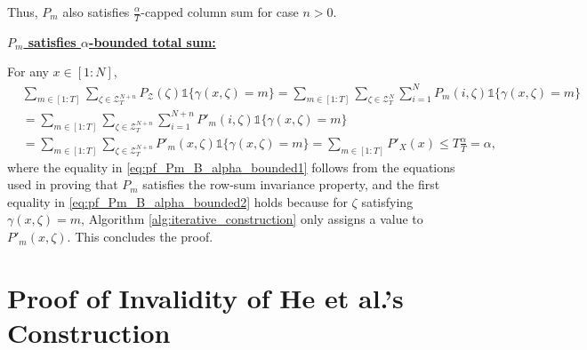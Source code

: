 \documentclass[11pt,letterpaper]{article}
\newcommand{\cZ}{\mathcal{Z}}
\begin{document}
Thus, $P_m$ also satisfies $\tfrac{\alpha}{T}$-capped column sum for case $n>0$.


\underline{\textbf{$P_m$ satisfies $\alpha$-bounded total sum:}}

For any $x\in[1:N]$, 
\begin{align}
    & \sum_{m \in [1:T]} \sum_{\zeta \in \cZ^{N+n}_T} P_\cZ(\zeta)\mathds{1} {\{ \gamma(x,\zeta) = m\}}  = \sum_{m \in [1:T]} \sum_{\zeta \in \cZ^{N}_T} \sum_{i=1}^{N} P_m(i,\zeta)\mathds{1} {\{ \gamma(x,\zeta) = m\}}\\
    & = \sum_{m \in [1:T]} \sum_{\zeta \in \cZ^{N+n}_T} \sum_{i=1}^{N+n} P'_m(i,\zeta)\mathds{1} {\{ \gamma(x,\zeta) = m\}}  \label{eq:pf_Pm_B_alpha_bounded1} \\
    & = \sum_{m \in [1:T]} \sum_{\zeta \in \cZ^{N+n}_T} P'_m(x,\zeta)\mathds{1} {\{ \gamma(x,\zeta) = m\}} = \sum_{m \in [1:T]} P'_X(x) \leq T\frac{\alpha}{T} = \alpha,  \label{eq:pf_Pm_B_alpha_bounded2} 
\end{align}
where the equality in \eqref{eq:pf_Pm_B_alpha_bounded1} follows from the equations used in proving that $P_m$ satisfies the row-sum invariance property, and the first equality in \eqref{eq:pf_Pm_B_alpha_bounded2} holds because for $\zeta$ satisfying $\gamma(x,\zeta) = m$, Algorithm \ref{alg:iterative_construction} only assigns a value to $P'_m(x,\zeta)$. This concludes the proof. 

\section{Proof of Invalidity of He et al.'s Construction} \label{sec:he_construction_proof}
\end{document}
